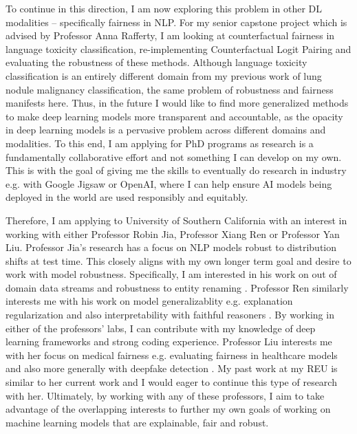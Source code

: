 \documentclass[10pt]{article}
\begin{document}
To continue in this direction, I am now exploring this problem in other DL modalities -- specifically fairness in NLP. For my senior capstone project which is advised by Professor Anna Rafferty, I am looking at counterfactual fairness in language toxicity classification, re-implementing Counterfactual Logit Pairing \cite{garg2019counterfactual} and evaluating the robustness of these methods. Although language toxicity classification is an entirely different domain from my previous work of lung nodule malignancy classification, the same problem of robustness and fairness manifests here. Thus, in the future I would like to find more generalized methods to make deep learning models more transparent and accountable, 
as the opacity in deep learning models is a pervasive problem across different domains and modalities.
To this end, I am applying for PhD programs as research is a fundamentally collaborative effort and not something I can develop on my own.
This is with the goal of giving me the skills to eventually do research in industry e.g. with Google Jigsaw or OpenAI, where I can help ensure AI models being deployed in the world are used responsibly and equitably.

Therefore, I am applying to University of Southern California with an interest in working with either Professor Robin Jia, Professor Xiang Ren or Professor Yan Liu.
Professor Jia's research has a focus on NLP models robust to distribution shifts at test time. This closely aligns with my own longer term goal and desire to work with model robustness. Specifically, I am interested in his work on out of domain data streams \cite{lin-etal-2022-continual} and robustness to entity renaming \cite{yan-etal-2022-robustness}.
Professor Ren similarly interests me with his work on model generalizablity e.g. explanation regularization \cite{joshi2022er} and also interpretability with faithful reasoners \cite{sanyal2022fairr}.
By working in either of the professors' labs, I can contribute with my knowledge of deep learning frameworks and strong coding experience. %
Professor Liu interests me with her focus on medical fairness e.g. evaluating fairness in healthcare models \cite{meng2022interpretability} and also more generally with deepfake detection \cite{trinh2021examination}. My past work at my REU is similar to her current work and I would eager to continue this type of research with her.
Ultimately, by working with any of these professors, I aim to take advantage of the overlapping interests to further my own goals of working on machine learning models that are explainable, fair and robust.
\end{document}
